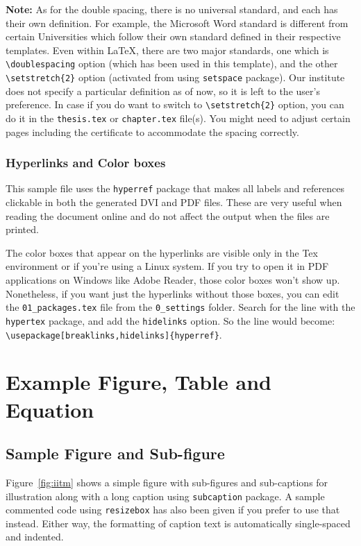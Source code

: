 \textbf{Note:} As for the double spacing, there is no universal standard, and each has their own definition. For example, the Microsoft Word standard is different from certain Universities which follow their own standard defined in their respective templates. Even within \LaTeX, there are two major standards, one which is \verb+\doublespacing+ option (which has been used in this template), and the other \verb+\setstretch{2}+ option (activated from using \texttt{setspace} package). Our institute does not specify a particular definition as of now, so it is left to the user's preference. In case if you do want to switch to \verb+\setstretch{2}+ option, you can do it in the \verb+thesis.tex+ or \verb+chapter.tex+ file(s). You might need to adjust certain pages including the certificate to accommodate the spacing correctly.


\subsubsection{Hyperlinks and Color boxes}
This sample file uses the \verb+hyperref+ package that makes all labels and references clickable in both the generated DVI and PDF files.  These are very useful when reading the document online and do not affect the output when the files are printed.

The color boxes that appear on the hyperlinks are visible only in the Tex environment or if you're using a Linux system. If you try to open it in PDF applications on Windows like Adobe Reader, those color boxes won't show up. Nonetheless, if you want just the hyperlinks without those boxes, you can edit the \verb+01_packages.tex+ file from the \verb+0_settings+ folder. Search for the line with the \verb+hypertex+ package, and add the \verb+hidelinks+ option. So the line would become: \verb+\usepackage[breaklinks,hidelinks]{hyperref}+.

\section{Example Figure, Table and Equation}

\subsection{Sample Figure and Sub-figure}
Figure~\ref{fig:iitm} shows a simple figure with sub-figures and sub-captions for illustration along with a long caption using \verb+subcaption+ package.  A sample commented code using \verb|resizebox| has also been given if you prefer to use that instead. Either way, the formatting of caption text is automatically single-spaced and indented.

